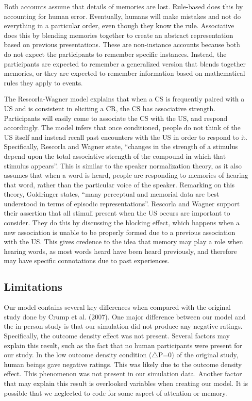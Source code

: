 \documentclass[
  english,
  man,floatsintext]{apa6}
\begin{document}
Both accounts assume that details of memories are lost. Rule-based does this by accounting for human error. Eventually, humans will make mistakes and not do everything in a particular order, even though they know the rule. Associative does this by blending memories together to create an abstract representation based on previous presentations. These are non-instance accounts because both do not expect the participants to remember specific instances. Instead, the participants are expected to remember a generalized version that blends together memories, or they are expected to remember information based on mathematical rules they apply to events.

The Rescorla-Wagner model explains that when a CS is frequently paired with a US and is consistent in eliciting a CR, the CS has associative strength. Participants will easily come to associate the CS with the US, and respond accordingly. The model infers that once conditioned, people do not think of the US itself and instead recall past encounters with the US in order to respond to it. Specifically, Rescorla and Wagner state, \enquote{changes in the strength of a stimulus depend upon the total associative strength of the compound in which that stimulus appears}. This is similar to the speaker normalization theory, as it also assumes that when a word is heard, people are responding to memories of hearing that word, rather than the particular voice of the speaker. Remarking on this theory, Goldringer states, \enquote{many perceptual and memorial data are best understood in terms of episodic representations}. Rescorla and Wagner support their assertion that all stimuli present when the US occurs are important to consider. They do this by discussing the blocking effect, which happens when a new association is unable to be properly formed due to a previous association with the US. This gives credence to the idea that memory may play a role when hearing words, as most words heard have been heard previously, and therefore may have specific connotations due to past experiences.

\hypertarget{limitations}{%
\subsection{Limitations}\label{limitations}}

Our model contains several key differences when compared with the original study done by Crump et al. (2007). One major difference between our model and the in-person study is that our simulation did not produce any negative ratings. Specifically, the outcome density effect was not present. Several factors may explain this result, such as the fact that no human participants were present for our study. In the low outcome density condition (\(\triangle\)P=0) of the original study, human beings gave negative ratings. This was likely due to the outcome density effect. This phenomenon was not present in our simulation data. Another factor that may explain this result is overlooked variables when creating our model. It is possible that we neglected to code for some aspect of attention or memory.
\end{document}
